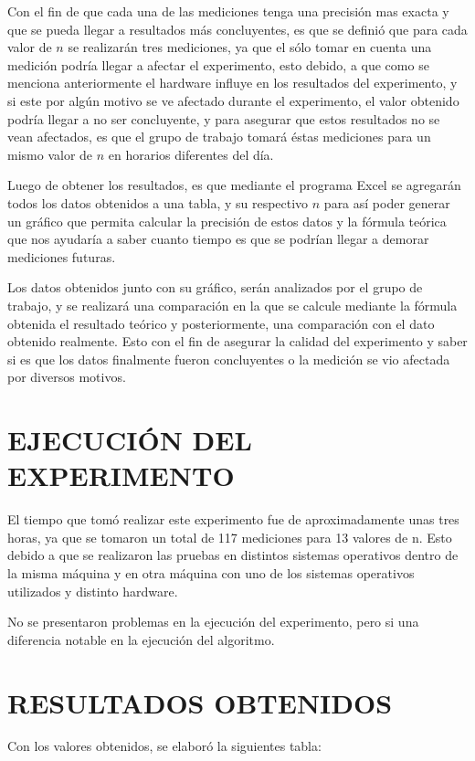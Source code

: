 \documentclass[11pt, twocolumn]{llncs}
\begin{document}
Con el fin de que cada una de las mediciones tenga una precisión mas exacta y que se pueda llegar a resultados más concluyentes, es que se definió que para cada valor de $n$ se realizarán tres mediciones, ya que el sólo tomar en cuenta una medición podría llegar a afectar el experimento, esto debido, a que como se menciona anteriormente el hardware influye en los resultados del experimento, y si este por algún motivo se ve afectado durante el experimento, el valor obtenido podría llegar a no ser concluyente, y para asegurar que estos resultados no se vean afectados, es que el grupo de trabajo tomará éstas mediciones para un mismo valor de $n$ en horarios diferentes del día.

Luego de obtener los resultados, es que mediante el programa Excel se agregarán todos los datos obtenidos a una tabla, y su respectivo $n$ para así poder generar un gráfico que permita calcular la precisión de estos datos y la fórmula teórica que nos ayudaría a saber cuanto tiempo es que se podrían llegar a demorar mediciones futuras.

Los datos obtenidos junto con su gráfico, serán analizados por el grupo de trabajo, y se realizará una comparación en la que se calcule mediante la fórmula obtenida el resultado teórico y posteriormente, una comparación con el dato obtenido realmente. Esto con el fin de asegurar la calidad del experimento y saber si es que los datos finalmente fueron concluyentes o la medición se vio afectada por diversos motivos.

\section{EJECUCIÓN DEL EXPERIMENTO}\label{ejecucion}
El tiempo que tomó realizar este experimento
fue de aproximadamente unas tres horas,
ya que se tomaron un total de 117 mediciones para 13 valores de n. Esto debido a que se realizaron las pruebas en distintos sistemas operativos dentro de la misma máquina y en otra máquina con uno de los sistemas operativos utilizados y distinto hardware.

No se presentaron problemas en la ejecución del experimento, pero si una diferencia notable en la ejecución del algoritmo.

\section{RESULTADOS OBTENIDOS}\label{resultados}
Con los valores obtenidos, se elaboró la siguientes tabla:
\end{document}
